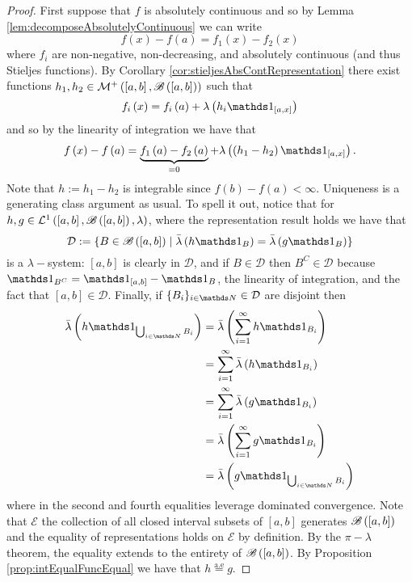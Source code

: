 \begin{proof}
First suppose that $f$ is absolutely continuous and so by Lemma \ref{lem:decomposeAbsolutelyContinuous}
we can write 
\[
f\left(x\right)-f\left(a\right)=f_{1}\left(x\right)-f_{2}\left(x\right)
\]
where $f_{i}$ are non-negative, non-decreasing, and absolutely continuous
(and thus Stieljes functions). By Corollary \ref{cor:stieljesAbsContRepresentation}
there exist functions $h_{1},h_{2}\in\mathcal{M}^{+}\left(\left[a,b\right],\mathscr{B}\left(\left[a,b\right]\right)\right)$
such that
\[
f_{i}\left(x\right)=f_{i}\left(a\right)+\lambda\left(h_{i}\indicate_{\left[a,x\right]}\right)
\]
and so by the linearity of integration we have that 
\[
f\left(x\right)-f\left(a\right)=\underbrace{f_{1}\left(a\right)-f_{2}\left(a\right)}_{=0}+\lambda\left(\left(h_{1}-h_{2}\right)\indicate_{\left[a,x\right]}\right).
\]
Note that $h:=h_{1}-h_{2}$ is integrable since $f\left(b\right)-f\left(a\right)<\infty$.
Uniqueness is a generating class argument as usual. To spell it out, notice that for  $h,g\in\mathcal{L}^{1}\left(\left[a,b\right],\mathscr{B}\left(\left[a,b\right]\right),\lambda\right)$, where the representation result holds we have that 
\[
	\mathcal{D} : = \{ B \in \borel \left(\left[a,b\right] \right) \mid \lebInt{\lambda}{h\indicate_{B}} = \lebInt{\lambda}{g\indicate_{B}} \}
\]
is a $\lambda-$system: $\left[a,b\right]$ is clearly in $\mathcal{D}$, and if $B \in \mathcal{D}$ then $B^C \in \mathcal{D}$ because $\indicate_{B^C} = \indicate_{[a,b]} - \indicate_{B}$, the linearity of integration, and the fact that $[a,b] \in \mathcal{D}$. Finally, if $\{B_i\}_{i\in\N} \in \mathcal{D}$ are disjoint then 
\begin{align*}
	\lebInt{\lambda}{h\indicate_{\bigcup_{i\in\N}B_i}} &= \lebInt{\lambda}{\sum_{i=1}^\infty h \indicate_{B_i}} \\
	&= \sum_{i=1}^\infty \lebInt{\lambda}{h\indicate_{B_i}} \\
	&=  \sum_{i=1}^\infty \lebInt{\lambda}{g\indicate_{B_i}} \\
	&= \lebInt{\lambda}{\sum_{i=1}^{\infty}g\indicate_{B_i}} \\
	&= 	\lebInt{\lambda}{g\indicate_{\bigcup_{i\in\N}B_i}}
\end{align*}
where in the second and fourth equalities leverage dominated convergence. Note that $\mathcal{E}$ the collection of all closed interval subsets of $[a,b]$ generates $\mathscr{B}\left([a,b]\right)$ and the equality of representations holds on $\mathcal{E}$ by definition. By the $\pi-\lambda$ theorem, the equality extends to the entirety of $\mathscr{B}\left([a,b]\right)$. By Proposition \ref{prop:intEqualFuncEqual} we have that $h \stackrel{\text{a.e}}{=} g $.


\end{proof}
